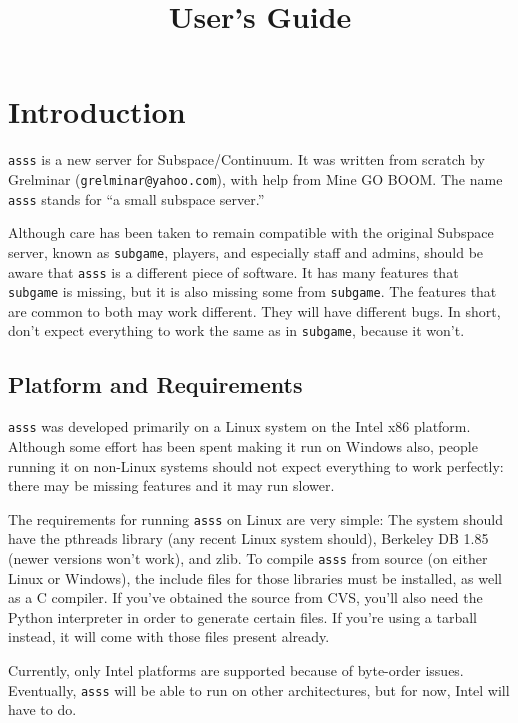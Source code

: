 \documentclass{article}
\title{\asss{} User's Guide}
\newcommand{\asss}{\texttt{asss}}
\newcommand{\subgame}{\texttt{subgame}}
\begin{document}
\maketitle

\section{Introduction}

\asss{} is a new server for Subspace/Continuum. It was written from
scratch by Grelminar (\verb/grelminar@yahoo.com/), with help from Mine
GO BOOM. %
The name \asss{} stands for ``a small subspace server.''

Although care has been taken to remain compatible with the original
Subspace server, known as \subgame{}, players, and especially staff and
admins, should be aware that \asss{} is a different piece of software. It
has many features that \subgame{} is missing, but it is also missing some
from \subgame{}. The features that are common to both may work different.
They will have different bugs. In short, don't expect everything to work
the same as in \subgame{}, because it won't.

\subsection{Platform and Requirements}

\asss{} was developed primarily on a Linux system on the Intel x86
platform. Although some effort has been spent making it run on Windows
also, people running it on non-Linux systems should not expect
everything to work perfectly: there may be missing features and it may
run slower.

The requirements for running \asss{} on Linux are very simple: The
system should have the pthreads library (any recent Linux system
should), Berkeley DB 1.85 (newer versions won't work), and zlib. To
compile \asss{} from source (on either Linux or Windows), the include
files for those libraries must be installed, as well as a C compiler. If
you've obtained the source from CVS, you'll also need the Python
interpreter in order to generate certain files. If you're using a
tarball instead, it will come with those files present already.

Currently, only Intel platforms are supported because of byte-order
issues. Eventually, \asss{} will be able to run on other architectures,
but for now, Intel will have to do.
\end{document}
